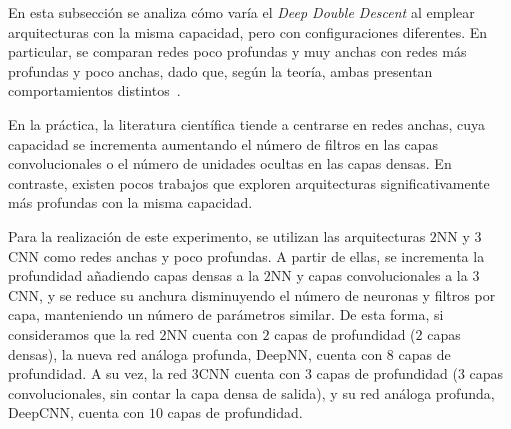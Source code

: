 En esta subsección se analiza cómo varía el \textit{Deep Double Descent} al emplear arquitecturas con la misma capacidad, pero con configuraciones diferentes. En particular, se comparan redes poco profundas y muy anchas con redes más profundas y poco anchas, dado que, según la teoría, ambas presentan comportamientos distintos~\cite{Nguyen2021}.\newline

En la práctica, la literatura científica tiende a centrarse en redes anchas, cuya capacidad se incrementa aumentando el número de filtros en las capas convolucionales o el número de unidades ocultas en las capas densas. En contraste, existen pocos trabajos que exploren arquitecturas significativamente más profundas con la misma capacidad.\newline

Para la realización de este experimento, se utilizan las arquitecturas $2$NN y $3$CNN como redes anchas y poco profundas. A partir de ellas, se incrementa la profundidad añadiendo capas densas a la $2$NN y capas convolucionales a la $3$CNN, y se reduce su anchura disminuyendo el número de neuronas y filtros por capa, manteniendo un número de parámetros similar. De esta forma, si consideramos que la red $2$NN cuenta con $2$ capas de profundidad ($2$ capas densas), la nueva red análoga profunda, DeepNN, cuenta con $8$ capas de profundidad. A su vez, la red $3$CNN cuenta con $3$ capas de profundidad ($3$ capas convolucionales, sin contar la capa densa de salida), y su red análoga profunda, DeepCNN, cuenta con $10$ capas de profundidad.\newline

